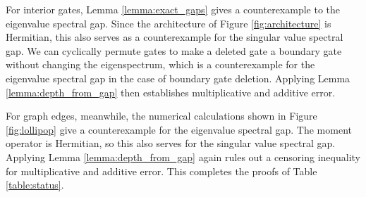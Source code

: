 \documentclass[aps,prx,floatfix,nofootinbib,superscriptaddress,longbibliography]{revtex4-2}
\begin{document}
\begin{appendices}
For interior gates, Lemma \ref{lemma:exact_gaps} gives a counterexample to the eigenvalue spectral gap. Since the architecture of Figure \ref{fig:architecture} is Hermitian, this also serves as a counterexample for the singular value spectral gap. We can cyclically permute gates to make a deleted gate a boundary gate without changing the eigenspectrum, which is a counterexample for the eigenvalue spectral gap in the case of boundary gate deletion. Applying Lemma \ref{lemma:depth_from_gap} then establishes multiplicative and additive error.

For graph edges, meanwhile, the numerical calculations shown in Figure \ref{fig:lollipop} 
give a counterexample for the eigenvalue spectral gap. The moment operator is Hermitian, so this also serves for the singular value spectral gap. Applying Lemma \ref{lemma:depth_from_gap} again rules out a censoring inequality for multiplicative and additive error. This completes the proofs of Table \ref{table:status}.
\end{appendices}
\end{document}
